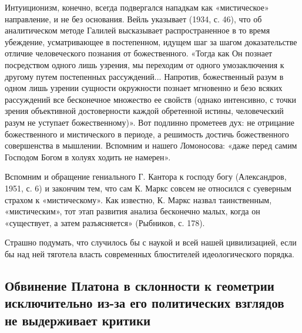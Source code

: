 Интуиционизм, конечно, всегда подвергался нападкам как «мистическое»
направление, и не без основания. Вейль указывает (1934, с. 46), что об
аналитическом методе Галилей высказывает распространенное в то время
убеждение, усматривающее в постепенном, идущем шаг за шагом
доказательстве отличие человеческого познания от божественного. «Тогда
как Он познает посредством одного лишь узрения, мы переходим от одного
умозаключения к другому путем постепенных рассуждений... Напротив,
божественный разум в одном лишь узрении сущности окружности познает
мгновенно и безо всяких рассуждений все бесконечное множество ее
свойств (однако интенсивно, с точки зрения объективной достоверности
каждой обретенной истины, человеческий разум не уступает
божественному)». Вот подлинно прометеев дух: не отрицание
божественного и мистического в периоде, а решимость достичь
божественного совершенства в мышлении. Вспомним и нашего Ломоносова:
«даже перед самим Господом Богом в холуях ходить не намерен».

Вспомним и обращение гениального Г. Кантора к господу богу
(Александров, 1951, с. 6) и закончим тем, что сам К. Маркс совсем не
относился с суеверным страхом к «мистическому». Как известно, К. Маркс
назвал таинственным, «мистическим», тот этап развития анализа
бесконечно малых, когда он «существует, а затем разъясняется»
(Рыбников, с. 178).

Страшно подумать, что случилось бы с наукой и всей нашей цивилизацией,
если бы над ней тяготела власть современных блюстителей
идеологического порядка.

\subsection{Обвинение Платона в склонности к геометрии исключительно
из-за его политических взглядов не выдерживает критики}

